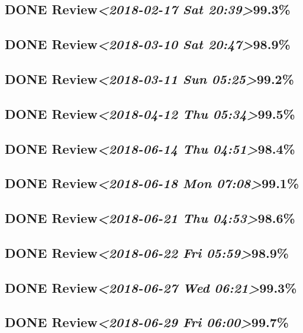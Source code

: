 \documentclass[11pt]{ctexart}
\begin{document}
\subsection{{\bfseries\sffamily DONE} Review\textit{<2018-02-17 Sat 20:39>}99.3\%}
\label{sec:org7d027b0}
\subsection{{\bfseries\sffamily DONE} Review\textit{<2018-03-10 Sat 20:47>}98.9\%}
\label{sec:org372363c}
\subsection{{\bfseries\sffamily DONE} Review\textit{<2018-03-11 Sun 05:25>}99.2\%}
\label{sec:org4010345}
\subsection{{\bfseries\sffamily DONE} Review\textit{<2018-04-12 Thu 05:34>}99.5\%}
\label{sec:org0060ece}

\subsection{{\bfseries\sffamily DONE} Review\textit{<2018-06-14 Thu 04:51>}98.4\%}
\label{sec:org4c00661}
\subsection{{\bfseries\sffamily DONE} Review\textit{<2018-06-18 Mon 07:08>}99.1\%}
\label{sec:org42b15dd}
\subsection{{\bfseries\sffamily DONE} Review\textit{<2018-06-21 Thu 04:53>}98.6\%}
\label{sec:org24473d5}
\subsection{{\bfseries\sffamily DONE} Review\textit{<2018-06-22 Fri 05:59>}98.9\%}
\label{sec:org269d840}
\subsection{{\bfseries\sffamily DONE} Review\textit{<2018-06-27 Wed 06:21>}99.3\%}
\label{sec:org6ed9d2a}
\subsection{{\bfseries\sffamily DONE} Review\textit{<2018-06-29 Fri 06:00>}99.7\%}
\label{sec:org82c587c}
\end{document}
